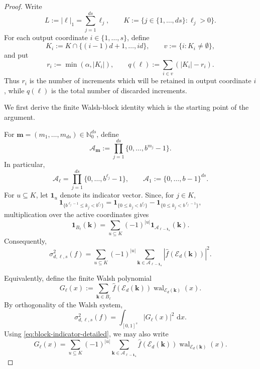 \documentclass[11pt]{article}
\newcommand{\Nzero}{\mathbb N_0}
\newcommand{\E}{\mathcal E}
\newcommand{\wal}{\operatorname{wal}}
\newcommand{\dd}{\,\mathrm d}
\begin{document}
\begin{proof}
Write
\[
 L:=|\boldsymbol\ell|_1
   =\sum_{j=1}^{ds}\ell_j,
 \qquad
 K:=\{j\in\{1,\ldots,ds\}:\ell_j>0\}.
\]
For each output coordinate $i\in\{1,\ldots,s\}$, define
\[
 K_i
 :=
 K\cap\{(i-1)d+1,\ldots,id\},
 \qquad
 v:=\{i:K_i\neq\emptyset\},
\]
and put
\[
 r_i:=\min(\alpha,|K_i|),
 \qquad
 q(\boldsymbol\ell)
 :=
 \sum_{i\in v}(|K_i|-r_i).
\]
Thus $r_i$ is the number of increments which will be retained in
output coordinate $i$, while $q(\boldsymbol\ell)$ is the total
number of discarded increments.

We first derive the finite Walsh-block identity which is the starting
point of the argument.

For
$\boldsymbol m=(m_1,\ldots,m_{ds})\in\Nzero^{ds}$, define
\[
 \mathcal A_{\boldsymbol m}
 :=
 \prod_{j=1}^{ds}\{0,\ldots,b^{m_j}-1\}.
\]
In particular,
\[
 \mathcal A_{\boldsymbol\ell}
 =
 \prod_{j=1}^{ds}\{0,\ldots,b^{\ell_j}-1\},
 \qquad
 \mathcal A_1:=\{0,\ldots,b-1\}^{ds}.
\]
For $u\subseteq K$, let $\boldsymbol1_u$ denote its indicator
vector.  Since, for $j\in K$,
\[
 \mathbf 1_{\{b^{\ell_j-1}\le k_j<b^{\ell_j}\}}
 =
 \mathbf 1_{\{0\le k_j<b^{\ell_j}\}}
 -
 \mathbf 1_{\{0\le k_j<b^{\ell_j-1}\}},
\]
multiplication over the active coordinates gives
\begin{equation}\label{eq:block-indicator-detailed}
 \mathbf1_{B_{\boldsymbol\ell}}(\boldsymbol k)
 =
 \sum_{u\subseteq K}
 (-1)^{|u|}
 \mathbf1_{\mathcal A_{\boldsymbol\ell-\boldsymbol1_u}}
 (\boldsymbol k).
\end{equation}
Consequently,
\begin{equation}\label{eq:block-inclusion-exclusion-detailed}
 \sigma_{d,\boldsymbol\ell,s}^2(f)
 =
 \sum_{u\subseteq K}(-1)^{|u|}
 \sum_{\boldsymbol k\in
       \mathcal A_{\boldsymbol\ell-\boldsymbol1_u}}
 \left|
   \widehat f(\E_d(\boldsymbol k))
 \right|^2.
\end{equation}

Equivalently, define the finite Walsh polynomial
\[
 G_{\boldsymbol\ell}(x)
 :=
 \sum_{\boldsymbol k\in B_{\boldsymbol\ell}}
 \widehat f(\E_d(\boldsymbol k))
 \wal_{\E_d(\boldsymbol k)}(x).
\]
By orthogonality of the Walsh system,
\begin{equation}\label{eq:block-parseval-detailed}
 \sigma_{d,\boldsymbol\ell,s}^2(f)
 =
 \int_{[0,1]^s}|G_{\boldsymbol\ell}(x)|^2\,\dd x.
\end{equation}
Using \eqref{eq:block-indicator-detailed}, we may also write
\begin{equation}\label{eq:G-inclusion-exclusion-detailed}
 G_{\boldsymbol\ell}(x)
 =
 \sum_{u\subseteq K}(-1)^{|u|}
 \sum_{\boldsymbol k\in
       \mathcal A_{\boldsymbol\ell-\boldsymbol1_u}}
 \widehat f(\E_d(\boldsymbol k))
 \wal_{\E_d(\boldsymbol k)}(x).
\end{equation}


\end{proof}
\end{document}
